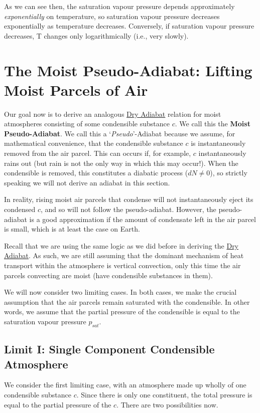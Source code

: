 As we can see then, the saturation vapour pressure depends approximately \textit{exponentially} on temperature, so saturation vapour pressure decreases exponentially as temperature decreases. Conversely, if saturation vapour pressure decreases, T changes only logarithmically (i.e., very slowly).

\section{The Moist Pseudo-Adiabat: Lifting Moist Parcels of Air}\label{Moist Pseudo Adiabat}

Our goal now is to derive an analogous \hyperref[Dry Adiabat]{Dry Adiabat} relation for moist atmospheres consisting of some condensible substance $c$. We call this the \textbf{Moist Pseudo-Adiabat}. We call this a `\textit{Pseudo}'-Adiabat because we assume, for mathematical convenience, that the condensible substance $c$ is instantaneously removed from the air parcel. This can occurs if, for example, $c$ instantaneously rains out (but rain is not the only way in which this may occur!). When the condensible is removed, this constitutes a diabatic process ($dN\neq 0$), so strictly speaking we will not derive an adiabat in this section.

In reality, rising moist air parcels that condense will not instantaneously eject its condensed $c$, and so will not follow the pseudo-adiabat. However, the pseudo-adiabat is a good approximation if the amount of condensate left in the air parcel is small, which is at least the case on Earth.

Recall that we are using the same logic as we did before in deriving the \hyperref[Dry Adiabat]{Dry Adiabat}. As such, we are still assuming that the dominant mechanism of heat transport within the atmosphere is vertical convection, only this time the air parcels convecting are moist (have condensible substances in them). 

We will now consider two limiting cases. In both cases, we make the crucial assumption that the air parcels remain saturated with the condensible. In other words, we assume that the partial pressure of the condensible is equal to the saturation vapour pressure $p_{sat}$.

\subsection{Limit I: Single Component Condensible Atmosphere} 

We consider the first limiting case, with an atmosphere made up wholly of one condensible substance $c$. Since there is only one constituent, the total pressure is equal to the partial pressure of the $c$. There are two possibilities now.

